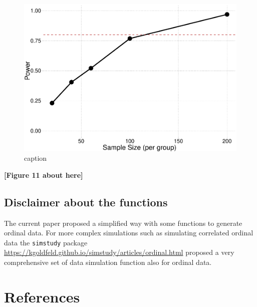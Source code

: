 \documentclass[
  man,floatsintext]{apa6}
\begin{document}
\normalsize

\scriptsize

\begin{figure}

{\centering \includegraphics{paper-new_files/figure-latex/fig-power-curve-1} 

}

\caption{caption}\label{fig:fig-power-curve}
\end{figure}

\begin{center}\textbf{[Figure 11 about here]} \end{center}

\normalsize

\subsection{Disclaimer about the functions}\label{disclaimer-about-the-functions}

The current paper proposed a simplified way with some functions to generate ordinal data. For more complex simulations such as simulating correlated ordinal data the \texttt{simstudy} package \url{https://kgoldfeld.github.io/simstudy/articles/ordinal.html} proposed a very comprehensive set of data simulation function also for ordinal data.

\newpage

\section{References}\label{references}
\end{document}

